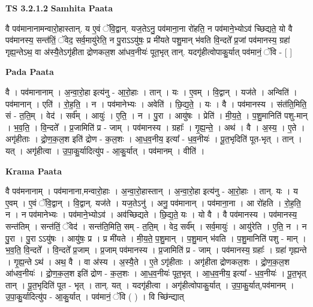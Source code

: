 \documentclass[17pt]{extarticle}
\begin{document}
\textbf{TS 3.2.1.2 } \newline
\textbf{Samhita Paata} \newline

वै पव॑मानानामन्वारो॒हास्तान्. य ए॒वं ॅवि॒द्वान्. यज॒तेऽनु॒ पव॑माना॒ना रो॑हति॒ न पव॑माने॒भ्योऽव॑ च्छिद्यते॒ यो वै पव॑मानस्य॒ सन्त॑तिं॒ ॅवेद॒ सर्व॒मायु॑रेति॒ न पु॒राऽऽयु॑षः॒ प्र मी॑यते पशु॒मान् भ॑वति वि॒न्दते᳚ प्र॒जां पव॑मानस्य॒ ग्रहा॑ गृह्य॒न्तेऽथ॒ वा अ॑स्यै॒तेऽगृ॑हीता द्रोणकल॒श आ॑धव॒नीयः॑ पूत॒भृत् तान्. यदगृ॑हीत्वोपाकु॒र्यात् पव॑मानं॒ ॅवि - [  ] \newline

\textbf{Pada Paata} \newline

वै । पव॑मानानाम् । अ॒न्वा॒रो॒हा इत्य॑नु - आ॒रो॒हाः । तान् । यः । ए॒वम् । वि॒द्वान् । यज॑ते । अन्विति॑ । पव॑मानान् । एति॑ । रो॒ह॒ति॒ । न । पव॑मानेभ्यः । अवेति॑ । छि॒द्य॒ते॒ । यः । वै । पव॑मानस्य । संत॑ति॒मिति॒ सं - त॒ति॒म् । वेद॑ । सर्व᳚म् । आयुः॑ । ए॒ति॒ । न । पु॒रा । आयु॑षः । प्रेति॑ । मी॒य॒ते॒ । प॒शु॒मानिति॑ पशु-मान् । भ॒व॒ति॒ । वि॒न्दते᳚ । प्र॒जामिति॑ प्र - जाम् । पव॑मानस्य । ग्रहाः᳚ । गृ॒ह्य॒न्ते॒ । अथ॑ । वै । अ॒स्य॒ । ए॒ते । अगृ॑हीताः । द्रो॒ण॒क॒ल॒श इति॑ द्रोण - क॒ल॒शः । आ॒ध॒व॒नीय॒ इत्या᳚ - ध॒व॒नीयः॑ । पू॒त॒भृदिति॑ पूत-भृत् । तान् । यत् । अगृ॑हीत्वा । उ॒पा॒कु॒र्यादित्यु॑प - आ॒कु॒र्यात् । पव॑मानम् । वीति॑ ।  \newline


\textbf{Krama Paata} \newline

वै पव॑मनानाम् । पव॑मानाना,मन्वारो॒हाः । अ॒न्वा॒रो॒हास्तान् । अ॒न्वा॒रो॒हा इत्य॑नु - आ॒रो॒हाः । तान्. यः । य ए॒वम् । ए॒वं ॅवि॒द्वान् । वि॒द्वान्. यज॑ते । यज॒तेऽनु॑ । अनु॒ पव॑मानान् । पव॑माना॒ना । आ रो॑हति । रो॒ह॒ति॒ न । न पव॑मानेभ्यः । पव॑माने॒भ्योऽव॑ । अव॑च्छिद्यते । छि॒द्य॒ते॒ यः । यो वै । वै पव॑मानस्य । पव॑मानस्य॒ सन्त॑तिम् । सन्त॑तिं॒ ॅवेद॑ । सन्त॑ति॒मिति॒ सम् - त॒ति॒म् । वेद॒ सर्व᳚म् । सर्व॒मायुः॑ । आयु॑रेति । ए॒ति॒ न । न पु॒रा । पु॒रा ऽऽयु॑षः । आयु॑षः॒ प्र । प्र मी॑यते । मी॒य॒ते॒ प॒शु॒मान् । प॒शु॒मान् भ॑वति । प॒शु॒मानिति॑ पशु - मान् । भ॒व॒ति॒ वि॒न्दते᳚ । वि॒न्दते᳚ प्र॒जाम् । प्र॒जाम् पव॑मानस्य । प्र॒जामिति॑ प्र - जाम् । पव॑मानस्य॒ ग्रहाः᳚ । ग्रहा॑ गृह्यन्ते । गृ॒ह्य॒न्ते ऽथ॑ । अथ॒ वै । वा अ॑स्य । अ॒स्यै॒ते । ए॒ते ऽगृ॑हीताः । अगृ॑हीता द्रोणकल॒शः । द्रो॒ण॒क॒ल॒श आ॑धव॒नीयः॑ । द्रो॒ण॒क॒ल॒श इति॑ द्रोण - क॒ल॒शः । आ॒ध॒व॒नीयः॑ पूत॒भृत् । आ॒ध॒व॒नीय॒ इत्या᳚ - ध॒व॒नीयः॑ । पू॒त॒भृत् तान् । पू॒त॒भृदिति॑ पूत - भृत् । तान्. यत् । यदगृ॑हीत्वा । अगृ॑हीत्वोपाकु॒र्यात् । उ॒पा॒कु॒र्यात्,पव॑मानम् । उ॒पा॒कु॒र्यादित्यु॑प - आ॒कु॒र्यात् । पव॑मानं॒ ॅवि ( ) । वि च्छि॑न्द्यात् \newline
\end{document}
